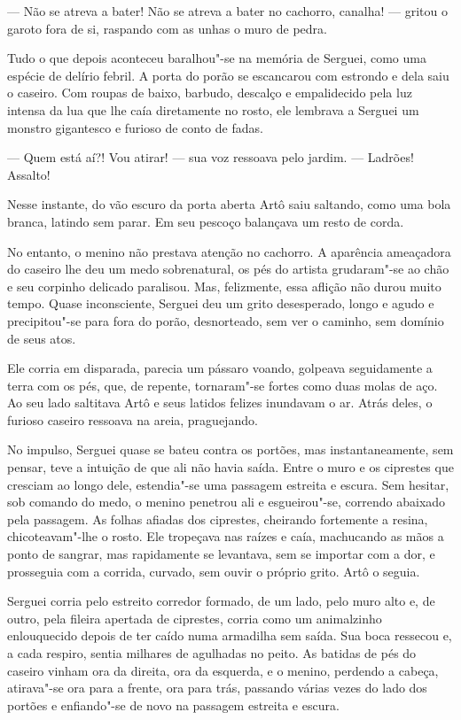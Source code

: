 --- Não se atreva a bater! Não se atreva a bater no cachorro, canalha!
--- gritou o garoto fora de si, raspando com as unhas o muro de pedra.

Tudo o que depois aconteceu baralhou"-se na memória de Serguei, como uma
espécie de delírio febril. A porta do porão se escancarou com estrondo e
dela saiu o caseiro. Com roupas de baixo, barbudo, descalço e
empalidecido pela luz intensa da lua que lhe caía diretamente no rosto,
ele lembrava a Serguei um monstro gigantesco e furioso de conto de
fadas.

--- Quem está aí?! Vou atirar! --- sua voz ressoava pelo jardim. ---
Ladrões! Assalto!

Nesse instante, do vão escuro da porta aberta Artô saiu saltando, como uma
bola branca, latindo sem parar. Em seu pescoço balançava um resto
de corda.

No entanto, o menino não prestava atenção no cachorro. A aparência
ameaçadora do caseiro lhe deu um medo sobrenatural, os pés do artista
grudaram"-se ao chão e seu corpinho delicado paralisou. Mas, felizmente,
essa aflição não durou muito tempo. Quase inconsciente, Serguei deu um
grito desesperado, longo e agudo e precipitou"-se para fora do porão,
desnorteado, sem ver o caminho, sem domínio de seus atos.

Ele corria em disparada, parecia um pássaro voando, golpeava
seguidamente a terra com os pés, que, de repente, tornaram"-se fortes
como duas molas de aço. Ao seu lado saltitava Artô e seus latidos
felizes inundavam o ar. Atrás deles, o furioso caseiro ressoava na
areia, praguejando.

No impulso, Serguei quase se bateu contra os portões, mas
instantaneamente, sem pensar, teve a intuição de que ali não havia
saída. Entre o muro e os ciprestes que cresciam ao longo dele,
estendia"-se uma passagem estreita e escura. Sem hesitar, sob comando do
medo, o menino penetrou ali e esgueirou"-se, correndo abaixado pela
passagem. As folhas afiadas dos ciprestes, cheirando fortemente a
resina, chicoteavam"-lhe o rosto. Ele tropeçava nas raízes e caía,
machucando as mãos a ponto de sangrar, mas rapidamente se levantava, sem
se importar com a dor, e prosseguia com a corrida, curvado, sem ouvir o
próprio grito. Artô o seguia.

Serguei corria pelo estreito corredor formado, de um lado, pelo muro
alto e, de outro, pela fileira apertada de ciprestes, corria como um
animalzinho enlouquecido depois de ter caído numa armadilha sem saída.
Sua boca ressecou e, a cada respiro, sentia milhares de agulhadas no
peito. As batidas de pés do caseiro vinham ora da direita, ora da
esquerda, e o menino, perdendo a cabeça, atirava"-se ora para a frente,
ora para trás, passando várias vezes do lado dos portões e enfiando"-se
de novo na passagem estreita e escura.

